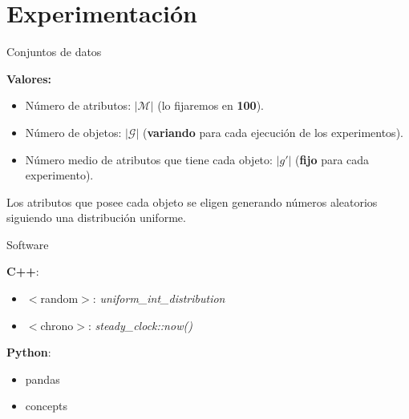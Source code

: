 \documentclass{beamer}
\newcommand{\M}{\mathcal{M}}
\newcommand{\G}{\mathcal{G}}
\begin{document}
\section{Experimentación}


 \begin{frame}{Conjuntos de datos}


    \textbf{Valores:}
    \begin{itemize}
        \item Número de atributos: \textbf{$|\M|$} (lo fijaremos en \textbf{100}).
        \pause
        \item Número de objetos: \textbf{$|\G|$} (\textbf{variando} para cada ejecución de los experimentos).
        \pause
        \item Número medio de atributos que tiene cada objeto: \textbf{$|g'|$} \linebreak (\textbf{fijo} para cada experimento).
    \end{itemize}
    \vspace{10mm}
    \pause
        Los atributos que posee cada objeto se eligen generando números aleatorios siguiendo una distribución uniforme.

  \end{frame}
  
 \iffalse
  \begin{frame}{Software}
    \begin{block}{\textbf{C++}:}
    \begin{itemize}
        \item $<$random$>$: \textit{uniform\_int\_distribution}
        \item $<$chrono$>$: \textit{steady\_clock::now()}
    \end{itemize}

    \end{block}
    \pause
    \begin{block}{\textbf{Python}:}
        \begin{itemize}
        \item pandas
        \item concepts
     \end{itemize}

    \end{block}
\end{frame}
\end{document}
